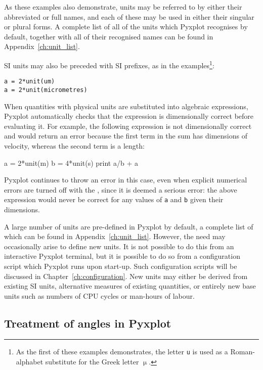 \noindent As these examples also demonstrate, units may be referred to by either
their abbreviated or full names, and each of these may be used in either their
singular or plural forms.  A complete list of all of the units which Pyxplot
recognises by default, together with all of their recognised names can be found
in Appendix~\ref{ch:unit_list}.

SI units may also be preceded with SI prefixes, as in
the examples\footnote{As the first of these examples demonstrates, the letter
{\tt u} is used as a Roman-alphabet substitute for the Greek letter $\upmu$.}:

\begin{verbatim}
a = 2*unit(um)
a = 2*unit(micrometres)
\end{verbatim}

When quantities with physical units are substituted into algebraic expressions,
Pyxplot automatically checks that the expression is dimensionally correct
before evaluating it. For example, the following expression is not
dimensionally correct and would return an error because the first term in the
sum has dimensions of velocity, whereas the second term is a length:

\begin{dontdo}
a = 2*unit(m)\newline
b = 4*unit(s)\newline
print a/b + a
\end{dontdo}

\noindent Pyxplot continues to throw an error in this case, even when explicit
numerical errors are turned off with the ,
since it is deemed a serious error: the above expression would never be correct
for any values of {\tt a} and {\tt b} given their dimensions.

A large number of units are pre-defined in Pyxplot by default, a complete list
of which can be found in Appendix~\ref{ch:unit_list}.  However, the need may
occasionally arise to define new units. It is not possible to do this from an
interactive Pyxplot terminal, but it is possible to do so from a configuration
script which Pyxplot runs upon start-up. Such configuration scripts will be
discussed in Chapter~\ref{ch:configuration}. New units may either be derived
from existing SI units, alternative measures of existing quantities, or
entirely new base units such as numbers of CPU cycles or man-hours of labour.

\subsection{Treatment of angles in Pyxplot}
\label{sec:angles}

